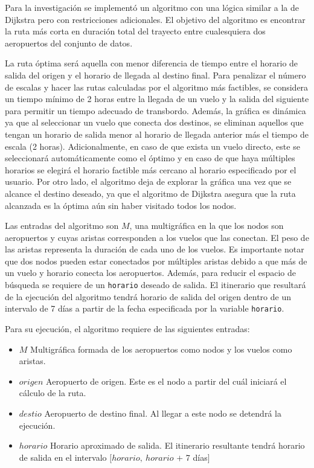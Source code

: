 Para la investigación se implementó un algoritmo con una lógica similar a la de Dijkstra pero con restricciones adicionales. El objetivo del algoritmo es encontrar la ruta más corta en duración total del trayecto entre cualesquiera dos aeropuertos del conjunto de datos.

La ruta óptima será aquella con menor diferencia de tiempo entre el horario de salida del origen y el horario de llegada al destino final. Para penalizar el número de escalas y hacer las rutas calculadas por el algoritmo más factibles, se considera un tiempo mínimo de 2 horas entre la llegada de un vuelo y la salida del siguiente para permitir un tiempo adecuado de transbordo. Además, la gráfica es dinámica ya que al seleccionar un vuelo que conecta dos destinos, se eliminan aquellos que tengan un horario de salida menor al horario de llegada anterior más el tiempo de escala (2 horas). Adicionalmente, en caso de que exista un vuelo directo, este se seleccionará automáticamente como el óptimo y en caso de que haya múltiples horarios se elegirá el horario factible más cercano al horario especificado por el usuario. Por otro lado, el algoritmo deja de explorar la gráfica una vez que se alcance el destino deseado, ya que el algoritmo de Dijkstra asegura que la ruta alcanzada es la óptima aún sin haber visitado todos los nodos.

Las entradas del algoritmo son $M$, una multigráfica en la que los nodos son aeropuertos y cuyas aristas corresponden a los vuelos que las conectan. El peso de las aristas representa la duración de cada uno de los vuelos. Es importante notar que dos nodos pueden estar conectados por múltiples aristas debido a que más de un vuelo y horario conecta los aeropuertos. Además, para reducir el espacio de búsqueda se requiere de un \texttt{horario} deseado de salida. El itinerario que resultará de la ejecución del algoritmo tendrá horario de salida del origen dentro de un intervalo de 7 días a partir de la fecha especificada por la variable \texttt{horario}.

Para su ejecución, el algoritmo requiere de las siguientes entradas:

\begin{itemize}
	\item $M$ Multigráfica formada de los aeropuertos como nodos y los vuelos como aristas.
	\item $origen$ Aeropuerto de origen. Este es el nodo a partir del cuál iniciará el cálculo de la ruta.
	\item $destio$ Aeropuerto de destino final. Al llegar a este nodo se detendrá la ejecución.
	\item $horario$ Horario aproximado de salida. El itinerario resultante tendrá horario de salida en el intervalo $[horario,\  horario$ $+$ 7 días$]$
\end{itemize}


